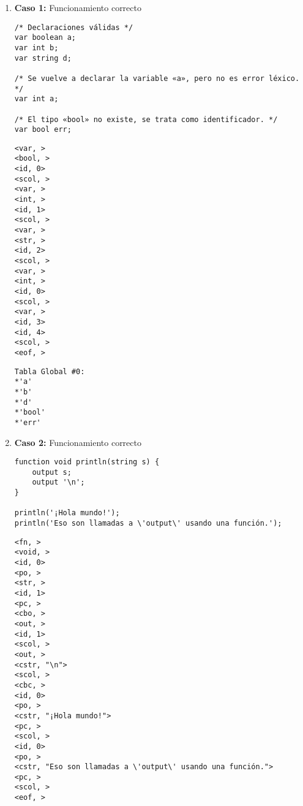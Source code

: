 
\begin{enumerate}

    \item \textbf{Caso 1:} Funcionamiento correcto
    \begin{tcolorbox}[title={Código fuente}, colback=white]
        \begin{lstlisting}
/* Declaraciones válidas */
var boolean a;
var int b;
var string d;

/* Se vuelve a declarar la variable «a», pero no es error léxico. */
var int a;

/* El tipo «bool» no existe, se trata como identificador. */
var bool err;
        \end{lstlisting}
    \end{tcolorbox}

    \begin{tcolorbox}[title={Volcado del fichero de tokens}, colback=white]
        \begin{lstlisting}
<var, >
<bool, >
<id, 0>
<scol, >
<var, >
<int, >
<id, 1>
<scol, >
<var, >
<str, >
<id, 2>
<scol, >
<var, >
<int, >
<id, 0>
<scol, >
<var, >
<id, 3>
<id, 4>
<scol, >
<eof, >
        \end{lstlisting}
    \end{tcolorbox}

    \begin{tcolorbox}[title={Volcado del fichero de la tabla de símbolos}, colback=white]
        \begin{lstlisting}
Tabla Global #0:
*'a'
*'b'
*'d'
*'bool'
*'err'
        \end{lstlisting}
    \end{tcolorbox}


    \item \textbf{Caso 2:} Funcionamiento correcto
    \begin{tcolorbox}[title={Código fuente}, colback=white]
        \begin{lstlisting}
function void println(string s) {
    output s;
    output '\n';
}

println('¡Hola mundo!');
println('Eso son llamadas a \'output\' usando una función.');
        \end{lstlisting}
    \end{tcolorbox}

    \begin{tcolorbox}[title={Volcado del fichero de tokens}, colback=white]
        \begin{lstlisting}
<fn, >
<void, >
<id, 0>
<po, >
<str, >
<id, 1>
<pc, >
<cbo, >
<out, >
<id, 1>
<scol, >
<out, >
<cstr, "\n">
<scol, >
<cbc, >
<id, 0>
<po, >
<cstr, "¡Hola mundo!">
<pc, >
<scol, >
<id, 0>
<po, >
<cstr, "Eso son llamadas a \'output\' usando una función.">
<pc, >
<scol, >
<eof, >
        \end{lstlisting}
    \end{tcolorbox}


\end{enumerate}
